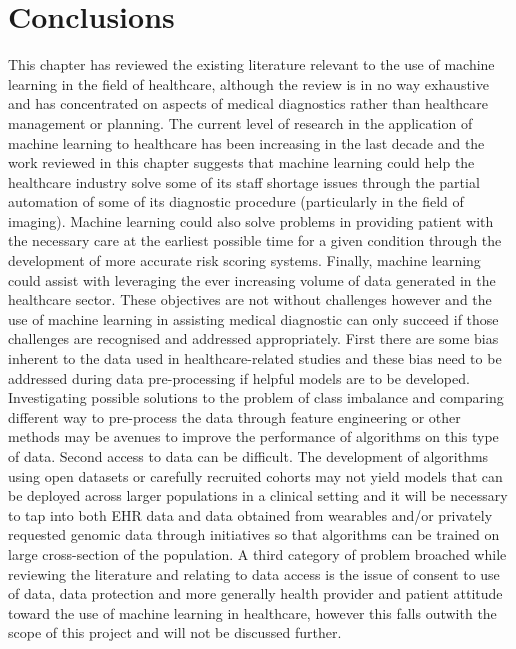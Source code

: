 \section{Conclusions}
This chapter has reviewed the existing literature relevant to the use of machine learning in the field of healthcare, although the review is in no way exhaustive and has concentrated on aspects of medical diagnostics rather than healthcare management or planning. 
The current level of research in the application of machine learning to healthcare has been increasing in the last decade and the work reviewed in this chapter suggests that machine learning could help the healthcare industry solve some of its staff shortage issues through the partial automation of some of its diagnostic procedure (particularly in the field of imaging). Machine learning could also solve problems in providing patient with the necessary care at the earliest possible time for a given condition through the development of more accurate risk scoring systems. Finally, machine learning could assist with leveraging the ever increasing volume of data generated in the healthcare sector.\newline
These objectives are not without challenges however and the use of machine learning in assisting medical diagnostic can only succeed if those challenges are recognised and addressed appropriately.
First there are some bias inherent to the data used in healthcare-related studies and these bias need to be addressed during data pre-processing if helpful models are to be developed. Investigating possible solutions to the problem of class imbalance and comparing different way to pre-process the data through feature engineering or other methods may be avenues to improve the performance of algorithms on this type of data.  \newline
Second access to data can be difficult. The development of algorithms using open datasets or carefully recruited cohorts may not yield models that can be deployed across larger populations in a clinical setting and it will be necessary to tap into both EHR data and data obtained from wearables and/or privately requested genomic data through initiatives so that algorithms can be trained on large cross-section of the population.
\newline
A third category of problem broached while reviewing the literature and relating to data access is the issue of consent to use of data, data protection and more generally health provider and patient attitude toward the use of machine learning in healthcare, however this falls outwith the scope of this project and will not be discussed further. 




